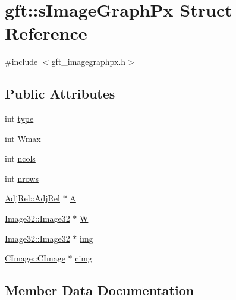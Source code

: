 \hypertarget{structgft_1_1sImageGraphPx}{}\section{gft\+:\+:s\+Image\+Graph\+Px Struct Reference}
\label{structgft_1_1sImageGraphPx}


{\ttfamily \#include $<$gft\+\_\+imagegraphpx.\+h$>$}

\subsection*{Public Attributes}
\begin{DoxyCompactItemize}
\item 
int \hyperlink{structgft_1_1sImageGraphPx_a8658742a1d494c94f0971c9821bf2738}{type}
\item 
int \hyperlink{structgft_1_1sImageGraphPx_a4f3aba97b6dfc649f8bb4294b38a9a98}{Wmax}
\item 
int \hyperlink{structgft_1_1sImageGraphPx_a6f02f874473ccde4eba034383be0c27d}{ncols}
\item 
int \hyperlink{structgft_1_1sImageGraphPx_aba52d902ebe625a5e330b28444f5d1e5}{nrows}
\item 
\hyperlink{namespacegft_1_1AdjRel_a832ff5521af7a9801ff18dc3ae629b68}{Adj\+Rel\+::\+Adj\+Rel} $\ast$ \hyperlink{structgft_1_1sImageGraphPx_ac0a0120c8027d2257505ea84ba8de456}{A}
\item 
\hyperlink{namespacegft_1_1Image32_a6c5a03566b593bb406f1fe33266a0382}{Image32\+::\+Image32} $\ast$ \hyperlink{structgft_1_1sImageGraphPx_a564f80400a073c030dd4f200582c1752}{W}
\item 
\hyperlink{namespacegft_1_1Image32_a6c5a03566b593bb406f1fe33266a0382}{Image32\+::\+Image32} $\ast$ \hyperlink{structgft_1_1sImageGraphPx_ababce16e4101688493c5e77cff250e79}{img}
\item 
\hyperlink{namespacegft_1_1CImage_ae3efa12a0ed0755314837d3e5c974556}{C\+Image\+::\+C\+Image} $\ast$ \hyperlink{structgft_1_1sImageGraphPx_a5ce62aaffb75a691be457f696e89038e}{cimg}
\end{DoxyCompactItemize}


\subsection{Member Data Documentation}

